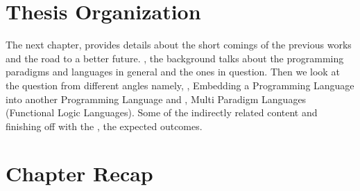 \documentclass[thesis-solanki.tex]{subfiles}
\begin{document}
\section{Thesis Organization}

The next chapter,  provides details about the short comings of the
previous works and the road to a better future.
, the background talks about the programming paradigms and languages
in general and the ones in question.
Then we look at the question from different angles namely, ,  Embedding
a Programming Language into another Programming Language and  , Multi
Paradigm Languages (Functional Logic Languages).
Some of the indirectly related content  and finishing off with the
, the expected outcomes.


\section{Chapter Recap\protect{}}
\end{document}
